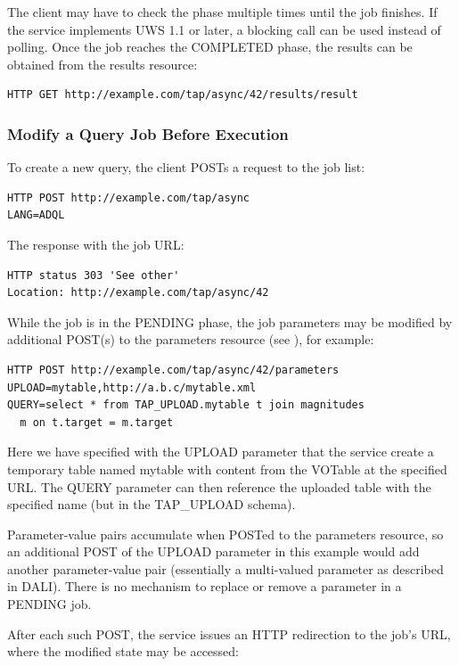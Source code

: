 \documentclass[11pt,letter]{ivoa}
\newcommand{\tapupload}{TAP\_UPLOAD}
\newcommand{\tapupload}{%
  {\relsize{-0.5}TAP\discretionary{-}{}{\kern-2pt\_}UPLOAD}}
\begin{document}
The client may have to check the phase multiple times until the job 
finishes. If the service implements UWS 1.1 \citep{2016ivoa.spec.1024H} or later, a blocking call
can be used instead of polling. Once the job reaches the COMPLETED phase, 
the results can be obtained from the results resource:

\begin{verbatim}
HTTP GET http://example.com/tap/async/42/results/result
\end{verbatim}

\subsubsection{Modify a Query Job Before Execution}
To create a new query, the client POSTs a request to the job list:

\begin{verbatim}
HTTP POST http://example.com/tap/async
LANG=ADQL
\end{verbatim}

The response with the job URL:

\begin{verbatim}
HTTP status 303 'See other'
Location: http://example.com/tap/async/42
\end{verbatim}

While the job is in the PENDING phase, the job parameters may be modified 
by additional POST(s) to the parameters resource (see 
\citet{2017ivoa.spec.0517D}), for example:

\begin{verbatim}
HTTP POST http://example.com/tap/async/42/parameters
UPLOAD=mytable,http://a.b.c/mytable.xml
QUERY=select * from TAP_UPLOAD.mytable t join magnitudes 
  m on t.target = m.target
\end{verbatim}

Here we have specified with the UPLOAD parameter that the service create a 
temporary table named mytable with content from the VOTable at the specified 
URL. The QUERY parameter can then reference the uploaded table with the 
specified name (but in the \tapupload{} schema).

Parameter-value pairs accumulate when POSTed to the parameters resource, so an 
additional POST of the UPLOAD parameter in this example would add another 
parameter-value pair (essentially a multi-valued parameter as described in 
DALI). There is no mechanism to replace or remove a parameter in a 
PENDING job.

After each such POST, the service issues an HTTP redirection to the job's URL, 
where the modified state may be accessed:
\end{document}
